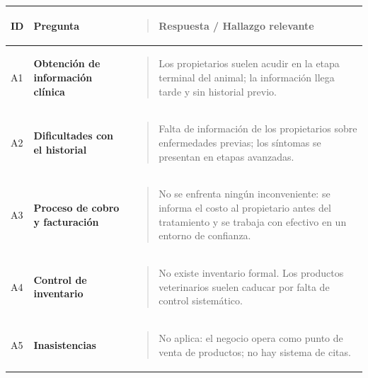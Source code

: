 \documentclass[
]{article}
\newcounter{none} %
\begin{document}
{\def\LTcaptype{none} %
\begin{longtable}[]{@{}
  >{\centering\arraybackslash}p{}
  >{\raggedright\arraybackslash}p{}
  >{\raggedright\arraybackslash}p{}@{}}
\toprule\noalign{}
\begin{minipage}[b]{\linewidth}\centering
\textbf{ID}
\end{minipage} & \begin{minipage}[b]{\linewidth}\centering
\textbf{Pregunta}
\end{minipage} & \begin{minipage}[b]{\linewidth}\raggedright
\begin{quote}
\textbf{Respuesta / Hallazgo relevante}
\end{quote}
\end{minipage} \\
\midrule\noalign{}
\endhead
\bottomrule\noalign{}
\endlastfoot
A1 & \textbf{Obtención de información clínica} &
\begin{minipage}[t]{\linewidth}\raggedright
\begin{quote}
Los propietarios suelen acudir en la etapa terminal del animal; la
información llega tarde y sin historial previo.
\end{quote}
\end{minipage} \\
A2 & \textbf{Dificultades con el historial} &
\begin{minipage}[t]{\linewidth}\raggedright
\begin{quote}
Falta de información de los propietarios sobre enfermedades previas; los
síntomas se presentan en etapas avanzadas.
\end{quote}
\end{minipage} \\
A3 & \textbf{Proceso de cobro y facturación} &
\begin{minipage}[t]{\linewidth}\raggedright
\begin{quote}
No se enfrenta ningún inconveniente: se informa el costo al propietario
antes del tratamiento y se trabaja con efectivo en un entorno de
confianza.
\end{quote}
\end{minipage} \\
A4 & \textbf{Control de inventario} &
\begin{minipage}[t]{\linewidth}\raggedright
\begin{quote}
No existe inventario formal. Los productos veterinarios suelen caducar
por falta de control sistemático.
\end{quote}
\end{minipage} \\
A5 & \textbf{Inasistencias} &
\begin{minipage}[t]{\linewidth}\raggedright
\begin{quote}
No aplica: el negocio opera como punto de venta de productos; no hay
sistema de citas.
\end{quote}
\end{minipage} \\
\end{longtable}
}
\end{document}
